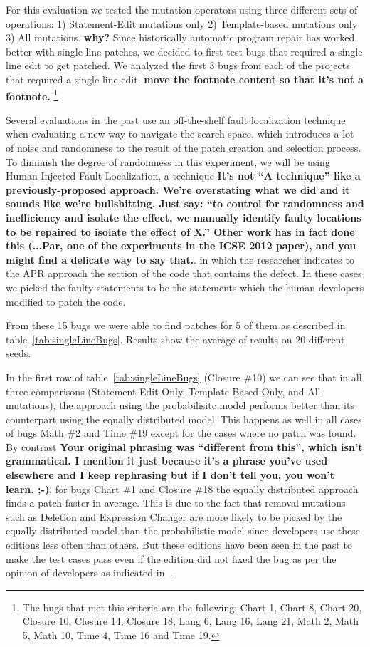 \documentclass[conference]{IEEEtran}
\newcommand{\todo}[1]
  {{\scriptsize \textbf{\color{red} {#1}}}}
\begin{document}
For this evaluation we tested the mutation operators using three different sets 
of operations: 1) Statement-Edit mutations only 2) Template-based mutations 
only 3) All mutations.  \todo{why?}
Since historically automatic program repair has worked better with single line 
patches, we decided to first test bugs that required a single line edit to get 
patched. We analyzed the first 3 bugs from each of the projects that required a 
single line edit.\todo{move the footnote content so that it's not a footnote.} \footnote{The bugs that met this criteria are the following: Chart 1, 
Chart 8, Chart 20, Closure 10, Closure 14, Closure 18, Lang 6, Lang 16, Lang 21, 
Math 2, Math 5, Math 10, Time 4, Time 16 and Time 19.}

Several evaluations in the past use an off-the-shelf fault localization
technique when evaluating a new way to navigate the search space, which
introduces a lot of noise and randomness to the result of the patch creation and
selection process. To diminish the degree of randomness in this experiment, we
will be using Human Injected Fault Localization, a technique\todo{It's not ``A
  technique'' like a previously-proposed approach.  We're
  overstating what we did and it sounds like we're bullshitting.  Just say: ``to
  control for randomness and inefficiency and isolate the effect, we manually
  identify faulty locations to be repaired to isolate the effect of X.''  Other
  work has in fact done this (...Par, one of the experiments in the ICSE 2012
  paper), and you might find a delicate way to say that.}. in which the
researcher indicates to the APR approach the section of the code that contains
the defect. In these cases we picked the faulty statements to be the statements
which the human developers modified to patch the code. 

From these 15 bugs we were able to find patches for 5 of them as described in
table~\ref{tab:singleLineBugs}. Results show the average of results on 
20 different seeds.  

In the first row of table~\ref{tab:singleLineBugs} (Closure \#10) we can see
that in all three comparisons (Statement-Edit Only, Template-Based Only, and All
mutations), the approach using the probabilisitc model performs better than its
counterpart using the equally distributed model. This happens as well in all
cases of bugs Math \#2 and Time \#19 except for the cases where no patch was
found. By contrast \todo{Your original phrasing was ``different from this'',
  which isn't grammatical.  I
  mention it just because it's a phrase you've used elsewhere and I keep
  rephrasing but if I don't tell you, you won't learn. ;-)}, for bugs Chart \#1 and Closure \#18 the equally
distributed approach finds a patch faster in average. This is due to the fact
that removal mutations such as Deletion and Expression Changer are more likely
to be picked by the equally distributed model than the probabilistic model since
developers use these editions less often than others. But these editions have
been seen in the past to make the test cases pass even if the edition did not
fixed the bug as per the opinion of developers as indicated in~\cite{kim2013}. 
\end{document}
